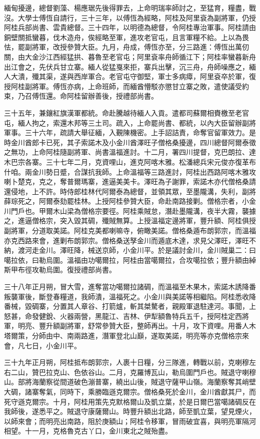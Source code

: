 \begin{pinyinscope}
緬甸擾邊，總督劉藻、楊應琚先後得罪去，上命明瑞率師討之，至猛育，糧盡，戰沒。大學士傅恆自請行，三十三年，以傅恆為經略，阿桂及阿里袞為副將軍，仍授阿桂兵部尚書、雲貴總督。三十四年，以明德為總督，令阿桂專治軍事。阿桂請由銅壁關抵蠻暮，伐木造舟，俟經略至軍，進攻老官屯，且言軍糧不給。上以為畏怯，罷副將軍，改授參贊大臣。九月，舟成，傅恆亦至，分三路進：傅恆出萬仞關，由大金沙江西經猛拱、暮魯至老官屯；阿里袞率舟師循江下；阿桂率蠻暮新舟出江會之，先伏兵甘立寨。緬人從猛戛來拒，寨兵出擊，沉三舟，舟師噪應之，緬人大潰，殲其渠，遂與西岸軍合。老官屯守御堅，軍士多病瘴，阿里袞卒於軍，復授阿桂副將軍。傅恆亦病，上命班師，而緬酋懵駁亦懲甘立寨之敗，遣使議受約束，乃召傅恆還。命阿桂留辦善後，授禮部尚書。

三十五年，兼鑲紅旗漢軍都統。命赴騰越待緬人入貢。遣都司蘇爾相賚檄至老官屯，緬人拘之，索還木邦等三土司。疏入，上命罷尚書、都統，以內大臣留辦副將軍事。三十六年，疏請大舉征緬，入覲陳機密。上手詔詰責，命奪官留軍效力。是時金川酋郎卡已死，其子索諾木及小金川酋澤旺子僧格桑擾邊，四川總督阿爾泰徵之無功，上命阿桂隨副將軍、尚書溫福進討。十二月，署四川提督，克巴朗拉、達木巴宗各寨。三十七年二月，克資哩山，進克阿喀木雅。松潘總兵宋元俊亦復革布什咱。兩金川勢日蹙，合謀抗我師。上命溫福等三路進討，阿桂出西路阿喀木雅攻喇卜楚克，克之，奪普爾瑪寨，進逼美美卡。澤旺為子謝罪，索諾木亦代僧格桑請還侵地，上不許。時侍郎桂林代阿爾泰為總督，並領其眾，至墨隴溝，失利，副將薛琮死之，阿爾泰劾罷桂林。上授阿桂參贊大臣，命赴南路接剿。僧格宗者，小金川門戶也。甲爾木山梁為僧格宗要徑。阿桂乘賊怠，潛赴墨隴溝，夜半大霧，襲據之，進逼僧格宗，突入毀其碉，殲賊無算。上授溫福定邊將軍，豐升額、阿桂俱授副將軍，分道取美諾。阿桂克美都喇嘛寺，俯瞰美諾。僧格桑遁布朗郭宗，而溫福亦克西路來會，進剿布朗郭宗。僧格桑送孥金川而遁底木達，求見父澤旺，澤旺不納，渡河走金川。澤旺降，械送京師，小金川平。於是議討金川，金川賊巢二：曰噶拉依，曰勒烏圍。溫福由功噶爾拉，阿桂由當噶爾拉，合攻噶拉依；豐升額由綽斯甲布徑攻勒烏圍。復授禮部尚書。

三十八年正月朔，冒大雪，進奪當功噶爾拉諸碉，而溫福至木果木，索諾木誘降番叛襲軍後，斷登春糧道，我師潰，溫福死之。小金川與美諾等相繼陷。阿桂悉收降番械，毀碉寨，分置其人章谷、打箭爐，斬其桀驁者，親殿軍退駐達河。事聞，上怒甚，命發健銳、火器兩營，黑龍江、吉林、伊犁額魯特兵五千，授阿桂定西將軍，明亮、豐升額副將軍，舒常參贊大臣，整師再出。十月，攻下資哩。用番人木塔爾策，分師由中、南兩路進，潛軍登北山巔，遂取美諾，明亮等亦克僧格宗來會，凡七日，小金川平。

三十九年正月朔，阿桂抵布朗郭宗，人裹十日糧，分三隊進，轉戰以前，克喇穆左右二山，贊巴拉克山、色依谷山。二月，克羅博瓦山，勒烏圍門戶也。賊退守喇穆山。部將海蘭察從間道破色漰普寨，繞出山後，賊退守薩甲山嶺。海蘭察奪其峭壁大碉，諸寨奪氣，同時下，乘勝臨遜克爾宗。僧格桑死於金川，金川酋獻其尸，而死守遜克爾宗。十月，阿桂用策先克默格爾山及凱立葉，於是日爾巴當噶諸碉反在我師後，遂悉平之。賊退守康薩爾山。時豐升額出北路，師至凱立葉，望見煙火，以師來會；而明亮出南路，阻於庚額山；阿桂令移軍，冒雨破宜喜，與明亮軍隔河相望。十一月，克格魯克古丫口，金川東北之賊殆盡。


\end{pinyinscope}
